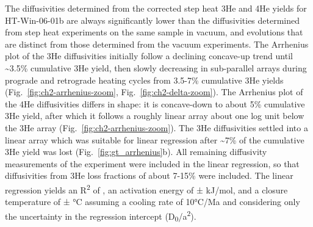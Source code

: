 The diffusivities determined from the corrected step heat 3He and 4He
yields for HT-Win-06-01b are always significantly lower than the
diffusivities determined from step heat experiments on the same sample
in vacuum, and evolutions that are distinct from those determined from
the vacuum experiments. The Arrhenius plot of the 3He diffusivities
initially follow a declining concave-up trend until \textasciitilde3.5\%
cumulative 3He yield, then slowly decreasing in sub-parallel arrays
during prograde and retrograde heating cycles from 3.5-7\% cumulative
3He yields (Fig.~\ref{fig:ch2-arrhenius-zoom}, Fig.~\ref{fig:ch2-delta-zoom}). The Arrhenius plot of the 4He diffusivities
differs in shape: it is concave-down to about 5\% cumulative 3He yield,
after which it follows a roughly linear array about one log unit below
the 3He array (Fig.~\ref{fig:ch2-arrhenius-zoom}). The 3He diffusivities settled into a
linear array which was suitable for linear regression after
\textasciitilde7\% of the cumulative 3He yield was lost (Fig.~\ref{fig:gt_arrhenius}b). All
remaining diffusivity measurements of the experiment were included in
the linear regression, so that diffusivities from 3He loss fractions of
about 7-15\% were included. The linear regression yields an
R\textsuperscript{2} of \ChTwoRtwo, an activation energy of \ChTwoEa ± \ChTwoEaErr
kJ/mol, and a closure temperature of \ChTwoTc ± \ChTwoTcErr °C assuming a cooling
rate of 10°C/Ma and considering only the uncertainty in the regression
intercept (D\textsubscript{0}/a\textsuperscript{2}).
